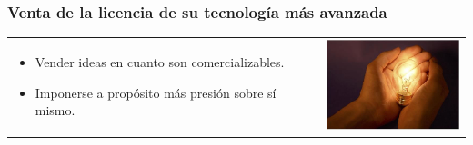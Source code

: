\frame
{
\frametitle{Venta de la licencia de su tecnología más avanzada}
\begin{table}
\begin{tabular}{p{7cm}p{3cm}}
\begin{itemize}
    \item Vender ideas en cuanto son comercializables.
    \item Imponerse a propósito más presión sobre sí mismo.
\end{itemize}
&
\vspace{1.5cm}
\includegraphics[width=4cm]{img/innovar.jpg}\\
\end{tabular}
\end{table}
}

